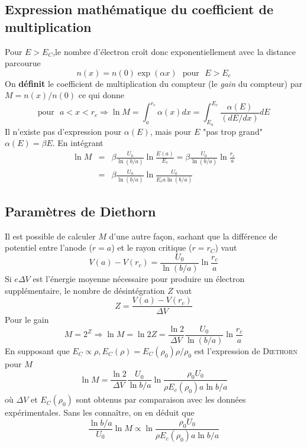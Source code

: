 \subsection{Expression mathématique du coefficient de multiplication}%
Pour $E>E_C$,le nombre d'électron croît donc exponentiellement avec la distance parcourue
\begin{equation}
n(x)=n(0)\exp{(\alpha x)} {\mbox{~~pour~~}}E>E_c
\end{equation}
On \textbf{définit} le coefficient de multiplication du compteur (le \textit{gain} du compteur) par
$M=n(x)/n(0)$ ce qui donne
\begin{equation}
{\mbox{pour~~}}a<x<r_c \Rightarrow \ln{M}=\int_a^{r_c}\alpha(x)dx=\int_{E_a}^{E_c}\frac{\alpha(E)}
{(dE/dx)}dE
\end{equation}
Il n'existe pas d'expression pour $\alpha(E)$, mais pour $E$ "pas trop grand" $\alpha(E)=\beta E$.
En intégrant
\begin{eqnarray}
\ln{M}&=&\beta\frac{U_0}{\ln{(b/a)}}\ln{\frac{E(a)}{E_c}}=\beta\frac{U_0}{\ln{(b/a)}}\ln{\frac{r_c}{a}}\\
&=&\beta\frac{U_0}{\ln{(b/a)}}\ln{\frac{U_0}{E_ca\ln{(b/a)}}}
\end{eqnarray}

\subsection{Paramètres de Diethorn}
Il est possible de calculer $M$ d'une autre façon, sachant que la différence de potentiel entre
l'anode ($r=a$) et le rayon critique ($r=r_C$) vaut
\begin{equation}
V(a)-V(r_c)=\frac{U_0}{\ln{(b/a)}}\ln{\frac{r_c}{a}}
\end{equation}
Si $e\Delta V$ est l'énergie moyenne nécessaire pour produire un électron supplémentaire, le nombre
de désintégration $Z$ vaut
\begin{equation}
Z=\frac{V(a)-V(r_c)}{\Delta V}
\end{equation}
Pour le gain
\begin{equation}
M=2^Z\Rightarrow \ln{M}=\ln{2}Z=\frac{\ln{2}}{\Delta V}\frac{U_0}{\ln{(b/a)}}\ln{\frac{r_c}{a}}
\end{equation}
En supposant que $E_C\propto\rho, E_C(\rho) = E_C(\rho_0)\rho/\rho_0$ est l'expression de 
\textsc{Diethorn} pour $M$
\begin{equation}
\ln{M}=\frac{\ln 2}{\Delta V}\frac{U_0}{\ln{b/a}}\ln{\frac{\rho_0U_0}{\rho E_c(\rho_0) a\ln{b/a}}}
\end{equation}
où $\Delta V$ et $E_C(\rho_0)$ sont obtenus par comparaison avec les données expérimentales. Sans
les connaître, on en déduit que
\begin{equation}
\frac{\ln{b/a}}{U_0}\ln{M}\propto \ln{\frac{\rho_0U_0}{\rho E_c(\rho_0) a\ln{b/a}}}
\end{equation}


